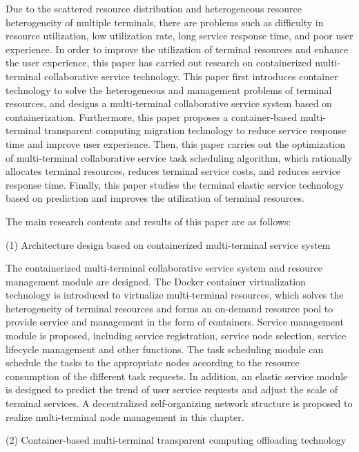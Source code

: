 Due to the scattered resource distribution and heterogeneous resource heterogeneity of multiple terminals, there are problems such as difficulty in resource utilization, low utilization rate, long service response time, and poor user experience. In order to improve the utilization of terminal resources and enhance the user experience, this paper has carried out research on containerized multi-terminal collaborative service technology.
This paper first introduces container technology to solve the heterogeneous and management problems of terminal resources, and designs a multi-terminal collaborative service system based on containerization. Furthermore, this paper proposes a container-based multi-terminal transparent computing migration technology to reduce service response time and improve user experience. Then, this paper carries out the optimization of multi-terminal collaborative service task scheduling algorithm, which rationally allocates terminal resources, reduces terminal service costs, and reduces service response time. Finally, this paper studies the terminal elastic service technology based on prediction and improves the utilization of terminal resources.

The main research contents and results of this paper are as follows:

(1) Architecture design based on containerized multi-terminal service system

The containerized multi-terminal collaborative service system and resource management module are designed. The Docker container virtualization technology is introduced to virtualize multi-terminal resources, which solves the heterogeneity of terminal resources and forms an on-demand resource pool to provide service and management in the form of containers. Service management module is proposed, including service registration, service node selection, service lifecycle management and other functions. The task scheduling module can schedule the tasks to the appropriate nodes according to the resource consumption of the different task requests. In addition, an elastic service module is designed to predict the trend of user service requests and adjust the scale of terminal services. A decentralized self-organizing network structure is proposed to realize multi-terminal node management in this chapter.

(2) Container-based multi-terminal transparent computing offloading technology


